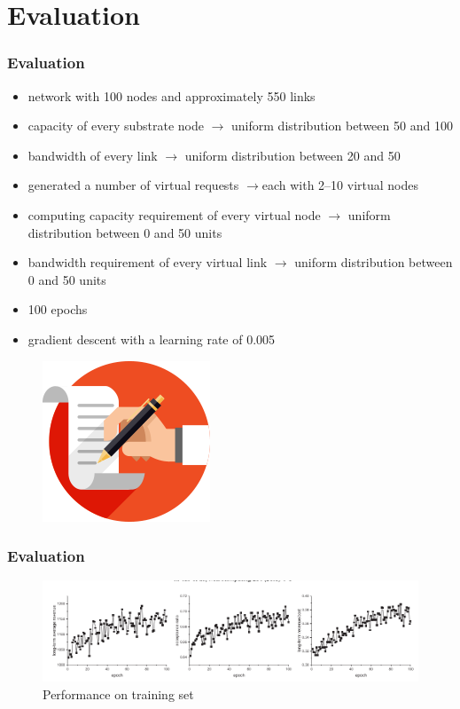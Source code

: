 \documentclass{beamer}
\begin{document}
\section{Evaluation}
\begin{frame}
	\frametitle{Evaluation}
	\begin{itemize}
		\item {network
			with 100 nodes and approximately 550 links}
		\item {capacity of every substrate node
		$\to$ uniform distribution between 50
			and 100}
		\item {bandwidth of every link $\to$ uniform distribution between 20 and 50}
		\item {generated a number of virtual requests $\to$each with 2–10
			virtual nodes
		}
	\item {computing capacity requirement of every virtual
		node $\to$ uniform distribution between 0 and 50 units}
	\item {bandwidth requirement of every virtual link $\to$ uniform distribution between 0 and 50 units}
	\item {100 epochs}
	\item {gradient descent with a learning rate of 0.005}
	\end{itemize}
\begin{figure}
	\centering
	\includegraphics[width=0.1\linewidth]{../Images/evaluation}
	\label{fig:evaluation}
\end{figure}

\end{frame}
\begin{frame}
	\frametitle{Evaluation}
	
\begin{figure}
	\centering
	\includegraphics[scale=0.35]{../Images/fig1}
	\caption{Performance on training set}
	\label{fig:fig1}
\end{figure}
\end{frame}
\end{document}
